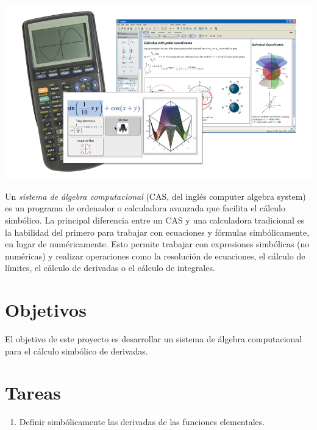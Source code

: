 \documentclass[
  a4paper,
]{scrreport}
\providecommand{\tightlist}{%
  \setlength{\itemsep}{0pt}\setlength{\parskip}{0pt}}\usepackage{longtable,booktabs,array}
\begin{document}
\includegraphics{./img/calculo-simbolico-derivadas/cas.png}

Un \emph{sistema de álgebra computacional} (CAS, del inglés computer
algebra system) es un programa de ordenador o calculadora avanzada que
facilita el cálculo simbólico. La principal diferencia entre un CAS y
una calculadora tradicional es la habilidad del primero para trabajar
con ecuaciones y fórmulas simbólicamente, en lugar de numéricamente.
Esto permite trabajar con expresiones simbólicas (no numéricas) y
realizar operaciones como la resolución de ecuaciones, el cálculo de
límites, el cálculo de derivadas o el cálculo de integrales.

\hypertarget{objetivos-3}{%
\section{Objetivos}\label{objetivos-3}}

El objetivo de este proyecto es desarrollar un sistema de álgebra
computacional para el cálculo simbólico de derivadas.

\hypertarget{tareas-3}{%
\section{Tareas}\label{tareas-3}}

\begin{enumerate}
\def\labelenumi{\arabic{enumi}.}
\tightlist
\item
  Definir simbólicamente las derivadas de las funciones elementales.
\end{enumerate}
\end{document}
